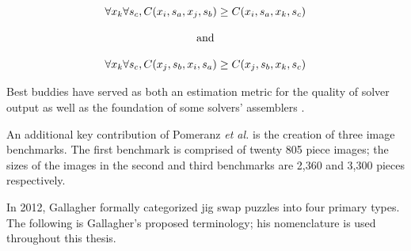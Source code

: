 \begin{equation} \label{eq:pomeranzBestBuddyDefinition}
\centering
\begin{split}
	\begin{matrix}
		\forall{x_{k}}\forall{s_c},C(x_i, s_a, x_j, s_b) \geq C(x_i, s_a, x_k, s_c)
		\\
		\\
		\textnormal{and}
		\\
		\\
		\forall{x_{k}}\forall{s_c},C(x_j, s_b, x_i, s_a) \geq C(x_j, s_b, x_k, s_c)
	\end{matrix}
\end{split}
\end{equation} 


Best buddies have served as both an estimation metric for the quality of solver output as well as the foundation of some solvers' assemblers \cite{paikin2015}.

An additional key contribution of Pomeranz \textit{et al.} is the creation of three image benchmarks.  The first benchmark is comprised of twenty 805 piece images; the sizes of the images in the second and third benchmarks are 2,360 and 3,300 pieces respectively.

In 2012, Gallagher \cite{gallagher2012} formally categorized jig swap puzzles into four primary types.  The following is Gallagher's proposed terminology; his nomenclature is used throughout this thesis.

